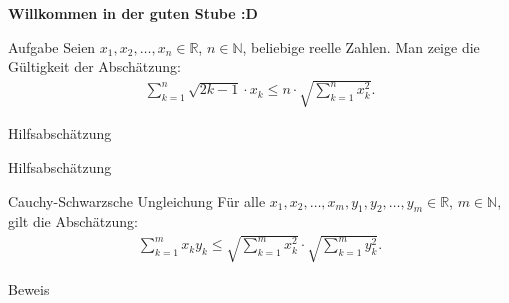 \documentclass[10pt]{beamer}
\title{}
\author{Artur's Mathematikstübchen}
\date{}
\def\bN{\mathbb{N}}
\def\bR{\mathbb{R}}
\begin{document}

\begin{frame}
    \begin{center}
        \textbf{\huge Willkommen in der guten Stube \newline \newline :D}
    \end{center}
\end{frame}




\begin{frame}
    \begin{alertblock}{Aufgabe}
        Seien \( x_{1}, x_{2}, \ldots, x_{n} \in \bR \), \( n \in \bN \), beliebige reelle Zahlen. Man zeige die Gültigkeit der Abschätzung:
        \begin{align*}
            \sum_{k = 1}^{n} \sqrt{2k - 1} \cdot x_{k}
            \leq n \cdot \sqrt{\sum_{k = 1}^{n} x_{k}^{2}}.
        \end{align*}
    \end{alertblock}
\end{frame}



\begin{frame}{Hilfsabschätzung}
    
\end{frame}



\begin{frame}{Hilfsabschätzung}
    \begin{block}{Cauchy-Schwarzsche Ungleichung}
        Für alle \( x_{1}, x_{2}, \ldots, x_{m}, y_{1}, y_{2}, \ldots, y_{m} \in \bR \), \( m \in \bN \), gilt die Abschätzung:
        \begin{align*}
            \sum_{k = 1}^{m} x_{k} y_{k}
            \leq \sqrt{\sum_{k = 1}^{m} x_{k}^{2}} \cdot \sqrt{\sum_{k = 1}^{m} y_{k}^{2}}.
        \end{align*}
    \end{block}
\end{frame}



\begin{frame}{Beweis}
    
\end{frame}
\end{document}
